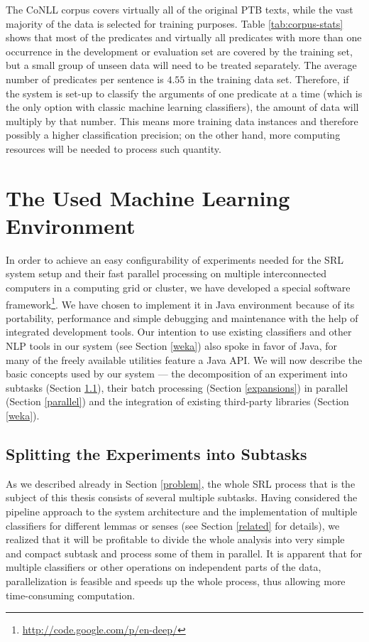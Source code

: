 \documentclass[12pt,notitlepage]{report}
\begin{document}
The CoNLL corpus covers virtually all of the original PTB texts, while the vast majority of the data is selected for training purposes. Table \ref{tab:corpus-stats} shows that most of the predicates and virtually all predicates with more than one occurrence in the development or evaluation set are covered by the training set, but a small group of unseen data will need to be treated separately. The average number of predicates per sentence is $4.55$ in the training data set. Therefore, if the system is set-up to classify the arguments of one predicate at a time (which is the only option with classic machine learning classifiers), the amount of data will multiply by that number. This means more training data instances and therefore possibly a higher classification precision; on the other hand, more computing resources will be needed to process such quantity.

%
%
\chapter{The Used Machine Learning Environment}\label{mlprocess}
%
%

In order to achieve an easy configurability of experiments needed for the SRL system setup and their fast parallel processing on multiple interconnected computers in a computing grid or cluster, we have developed a special software framework\footnote{\url{http://code.google.com/p/en-deep/}}. We have chosen to implement it in Java environment because of its portability, performance and simple debugging and maintenance with the help of integrated development tools. Our intention to use existing classifiers and other NLP tools in our system (see Section \ref{weka}) also spoke in favor of Java, for many of the freely available utilities feature a Java API. We will now describe the basic concepts used by our system --- the decomposition of an experiment into subtasks (Section \ref{tasks}), their batch processing (Section \ref{expansions}) in parallel (Section \ref{parallel}) and the integration of existing third-party libraries (Section \ref{weka}).

\section{Splitting the Experiments into Subtasks}\label{tasks}

As we described already in Section \ref{problem}, the whole SRL process that is the subject of this thesis consists of several multiple subtasks. Having considered the pipeline approach to the system architecture and the implementation of multiple classifiers for different lemmas or senses (see Section \ref{related} for details), we realized that it will be profitable to divide the whole analysis into very simple and compact subtask and process some of them in parallel. It is apparent that for multiple classifiers or other operations on independent parts of the data, parallelization is feasible and speeds up the whole process, thus allowing more time-consuming computation. 
\end{document}
